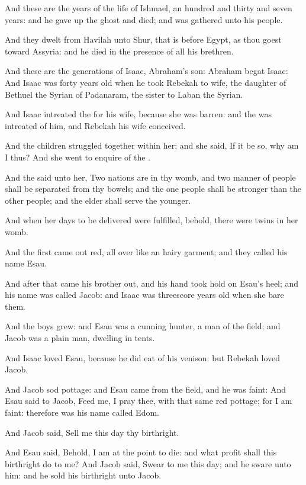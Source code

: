 \verse And these are the years of the life of Ishmael, an hundred and thirty and seven years: and he gave up the ghost and died; and was gathered unto his people.

\verse And they dwelt from Havilah unto Shur, that is before Egypt, as thou goest toward Assyria: and he died in the presence of all his brethren.

\verse And these are the generations of Isaac, Abraham's son: Abraham begat Isaac: \verse And Isaac was forty years old when he took Rebekah to wife, the daughter of Bethuel the Syrian of Padanaram, the sister to Laban the Syrian.

\verse And Isaac intreated the \LORD for his wife, because she was barren: and the \LORD was intreated of him, and Rebekah his wife conceived.

\verse And the children struggled together within her; and she said, If it be so, why am I thus? And she went to enquire of the \LORD.

\verse And the \LORD said unto her, Two nations are in thy womb, and two manner of people shall be separated from thy bowels; and the one people shall be stronger than the other people; and the elder shall serve the younger.

\verse And when her days to be delivered were fulfilled, behold, there were twins in her womb.

\verse And the first came out red, all over like an hairy garment; and they called his name Esau.

\verse And after that came his brother out, and his hand took hold on Esau's heel; and his name was called Jacob: and Isaac was threescore years old when she bare them.

\verse And the boys grew: and Esau was a cunning hunter, a man of the field; and Jacob was a plain man, dwelling in tents.

\verse And Isaac loved Esau, because he did eat of his venison: but Rebekah loved Jacob.

\verse And Jacob sod pottage: and Esau came from the field, and he was faint: \verse And Esau said to Jacob, Feed me, I pray thee, with that same red pottage; for I am faint: therefore was his name called Edom.

\verse And Jacob said, Sell me this day thy birthright.

\verse And Esau said, Behold, I am at the point to die: and what profit shall this birthright do to me?  \verse And Jacob said, Swear to me this day; and he sware unto him: and he sold his birthright unto Jacob.

